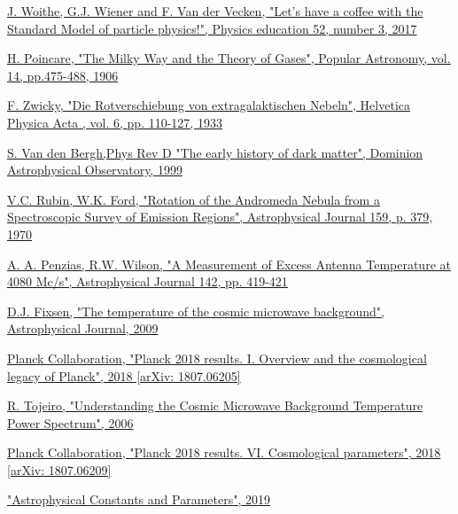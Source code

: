 \documentclass[a4paper, 10pt, openright]{report}
\begin{document}
\begin{thebibliography}{1}
\href{https://arxiv.org/abs/1808.10518}{J. Woithe, G.J. Wiener and F. Van der Vecken,
"Let's have a coffee with the Standard Model of particle physics!",
Physics education 52, number 3, 2017
}

\href{http://adsabs.harvard.edu/full/1906PA.....14..475P}{H. Poincare,
"The Milky Way and the Theory of Gases",
Popular Astronomy, vol. 14, pp.475-488, 1906}

\href{http://articles.adsabs.harvard.edu/cgi-bin/nph-iarticle_query?1933AcHPh...6..110Z&amp;data_type=PDF_HIGH&amp;whole_paper=YES&amp;type=PRINTER&amp;filetype=.pdf}{
F. Zwicky,
"Die Rotverschiebung von extragalaktischen Nebeln",
Helvetica Physica Acta , vol. 6, pp. 110-127, 1933}

\href{https://arxiv.org/pdf/astro-ph/9904251.pdf}{S. Van den Bergh,Phys Rev D
"The early history of dark matter",
Dominion Astrophysical Observatory, 1999
}

\href{https://ui.adsabs.harvard.edu/abs/1970ApJ...159..379R/abstract}{V.C. Rubin, W.K. Ford,
"Rotation of the Andromeda Nebula from a Spectroscopic Survey of Emission Regions",
Astrophysical Journal 159, p. 379, 1970
}

\href{https://ui.adsabs.harvard.edu/abs/1965ApJ...142..419P/abstract}{A. A. Penzias, R.W. Wilson,
"A Measurement of Excess Antenna Temperature at 4080 Mc/s",
Astrophysical Journal 142, pp. 419-421
}

\href{https://iopscience.iop.org/article/10.1088/0004-637X/707/2/916}{D.J. Fixsen,
"The temperature of the cosmic microwave background",
Astrophysical Journal, 2009
}

\href{https://arxiv.org/abs/1807.06205}{Planck Collaboration, 
"Planck 2018 results. I. Overview and the cosmological legacy of Planck", 2018 [arXiv: 1807.06205]
}


\href{https://www.roe.ac.uk/ifa/postgrad/pedagogy/2006_tojeiro.pdf}{R. Tojeiro,
"Understanding the Cosmic Microwave Background Temperature Power Spectrum",
2006
}

\href{https://arxiv.org/abs/1807.06209}{Planck Collaboration, 
"Planck 2018 results. VI. Cosmological parameters", 2018 [arXiv: 1807.06209]
}

\href{http://pdg.lbl.gov/2019/reviews/rpp2018-rev-astrophysical-constants.pdf}{
"Astrophysical Constants and Parameters", 
2019
}


\end{thebibliography}
\end{document}
